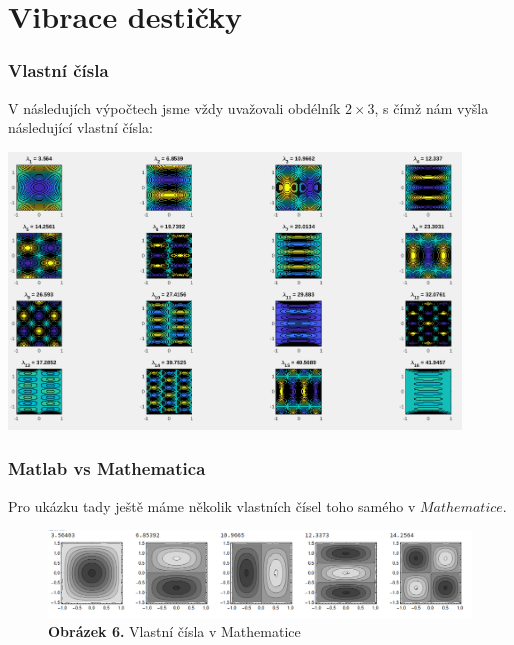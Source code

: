 \documentclass{beamer}
\begin{document}
\section*{Vibrace destičky}
\label{sec:desticka}

\begin{frame}
	\frametitle{Vlastní čísla}
	{\tiny V následujích výpočtech jsme vždy uvažovali obdélník $2 \times 3$, s čímž nám vyšla následující vlastní čísla:}\\
		\begin{minipage}[b]{1\textwidth}
			\centering
			\includegraphics[width=0.9\textwidth]{barevne.png}
		\end{minipage}
\end{frame}
\begin{frame}
	\frametitle{Matlab vs Mathematica}
	Pro ukázku tady ještě máme několik vlastních čísel toho samého v $Mathematice$.
	\begin{figure}[h!]
		\centering
		\includegraphics[width = 1\textwidth]{mathematica1.png}
		\caption*{\textbf{Obrázek 6.} Vlastní čísla v Mathematice}
	\end{figure}
\end{frame}
\end{document}
